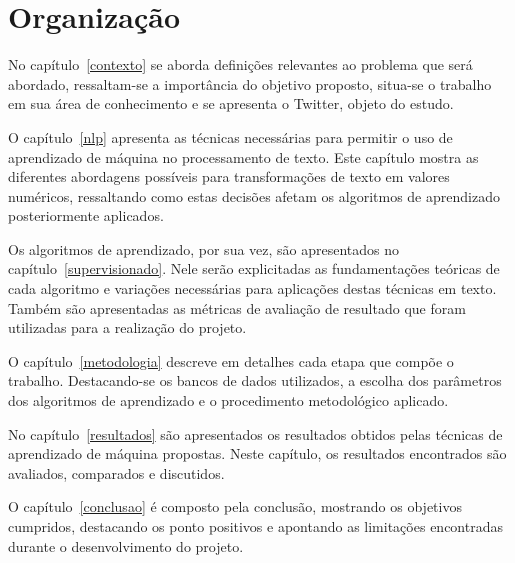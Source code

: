 \section{Organização}

No capítulo~\ref{contexto} se aborda definições relevantes ao problema que será abordado, ressaltam-se a importância do
objetivo proposto, situa-se o trabalho em sua área de conhecimento e se apresenta o Twitter, objeto do estudo.

O capítulo~\ref{nlp} apresenta as técnicas necessárias para permitir o uso de aprendizado de máquina no processamento de
texto.
Este capítulo mostra as diferentes abordagens possíveis para transformações de texto em valores numéricos, ressaltando
como estas decisões afetam os algoritmos de aprendizado posteriormente aplicados.

Os algoritmos de aprendizado, por sua vez, são apresentados no capítulo~\ref{supervisionado}.
Nele serão explicitadas as fundamentações teóricas de cada algoritmo e variações necessárias para aplicações destas
técnicas em texto.
Também são apresentadas as métricas de avaliação de resultado que foram utilizadas para a realização do projeto.

O capítulo~\ref{metodologia} descreve em detalhes cada etapa que compõe o trabalho.
Destacando-se os bancos de dados utilizados, a escolha dos parâmetros dos algoritmos de aprendizado e o procedimento
metodológico aplicado.

No capítulo~\ref{resultados} são apresentados os resultados obtidos pelas técnicas de aprendizado de máquina propostas.
Neste capítulo, os resultados encontrados são avaliados, comparados e discutidos.

O capítulo~\ref{conclusao} é composto pela conclusão, mostrando os objetivos cumpridos, destacando os ponto positivos e
apontando as limitações encontradas durante o desenvolvimento do projeto.

